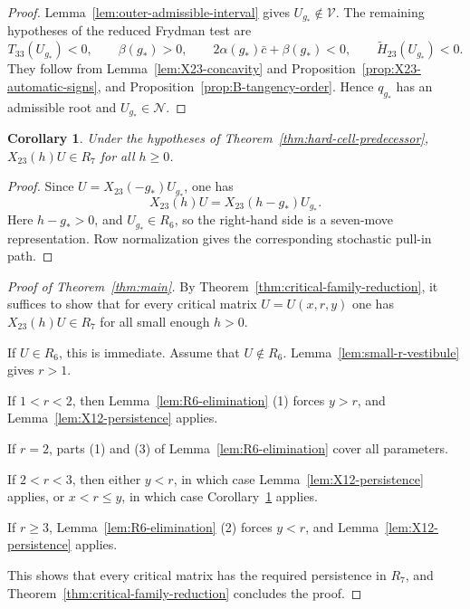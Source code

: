 \documentclass[11pt,onecolumn]{amsart}
\theoremstyle{plain}
\newtheorem{corollary}[theorem]{Corollary}
\theoremstyle{definition}
\theoremstyle{remark}
\newcommand{\V}{\mathcal V}
\newcommand{\NH}{\mathcal N}
\begin{document}
\begin{proof}
Lemma~\ref{lem:outer-admissible-interval} gives
$U_{g_*}\notin\V$.  The remaining hypotheses of the reduced
Frydman test are
\[
T_{33}(U_{g_*})<0,
\qquad
\beta(g_*)>0,
\qquad
2\alpha(g_*)\bar c+\beta(g_*)<0,
\qquad
\widetilde H_{23}(U_{g_*})<0.
\]
They follow from Lemma~\ref{lem:X23-concavity} and
Proposition~\ref{prop:X23-automatic-signs}, and
Proposition~\ref{prop:B-tangency-order}.  Hence $q_{g_*}$ has an admissible root and $U_{g_*}\in\NH$.
\end{proof}

\begin{corollary}
\label{cor:X23-forward-persistence}
Under the hypotheses of Theorem~\ref{thm:hard-cell-predecessor},
$X_{23}(h)U\in R_7$ for all $h\geq 0$.
\end{corollary}

\begin{proof}
Since $U=X_{23}(-g_*)U_{g_*}$, one has
\[
X_{23}(h)U=X_{23}(h-g_*)U_{g_*}.
\]
Here $h-g_*>0$, and $U_{g_*}\in R_6$, so the right-hand side is
a seven-move representation.  Row normalization gives the corresponding
stochastic pull-in path.
\end{proof}


\begin{proof}[Proof of Theorem~\ref{thm:main}]
By Theorem~\ref{thm:critical-family-reduction}, it suffices
to show that for every critical matrix $U=U(x,r,y)$ one has $X_{23}(h)U\in R_7$ for all small enough $h>0$.

If $U\in R_6$, this is immediate. Assume that $U\notin R_6$.
Lemma~\ref{lem:small-r-vestibule} gives $r>1$. 

If $1<r<2$, then
Lemma~\ref{lem:R6-elimination} (1) forces $y>r$, and
Lemma~\ref{lem:X12-persistence} applies. 

If $r=2$, parts (1) and (3)
of Lemma~\ref{lem:R6-elimination} cover all parameters. 

If $2<r<3$, then either $y<r$, in which case
Lemma~\ref{lem:X12-persistence} applies, or $x<r\leq y$, in which case
Corollary~\ref{cor:X23-forward-persistence} applies.

 If $r\geq3$,
Lemma~\ref{lem:R6-elimination} (2) forces $y<r$, and
Lemma~\ref{lem:X12-persistence} applies. 

This shows that every critical matrix has
the required persistence in $R_7$, and Theorem~\ref{thm:critical-family-reduction}
concludes the proof.
\end{proof}
\end{document}

